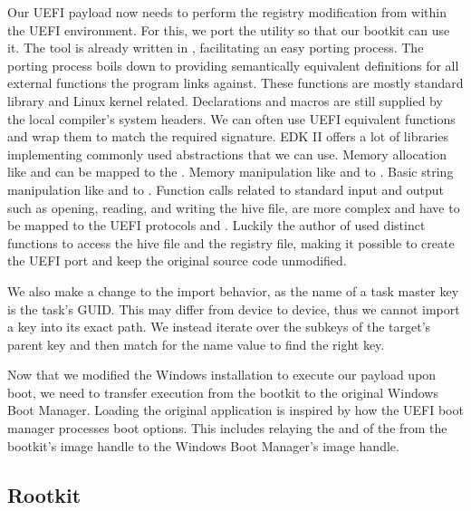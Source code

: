 Our \ac{UEFI} payload now needs to perform the registry modification from within the \ac{UEFI} environment.
For this, we port the  utility so that our bootkit can use it.
The tool is already written in , facilitating an easy porting process.
The porting process boils down to providing semantically equivalent definitions for all external functions the program links against.
These functions are mostly  standard library and Linux kernel related.
Declarations and macros are still supplied by the local compiler's system headers.
We can often use \ac{UEFI} equivalent functions and wrap them to match the required signature.
\ac{EDK} II offers a lot of libraries implementing commonly used abstractions that we can use.
Memory allocation like  and  can be mapped to the .
Memory manipulation like  and  to .
Basic string manipulation like  and  to .
Function calls related to standard input and output such as opening, reading, and writing the hive file, are more complex and have to be mapped to the \ac{UEFI} protocols  and .
Luckily the author of  used distinct functions to access the hive file and the registry file, making it possible to create the \ac{UEFI} port and keep the original source code unmodified.

We also make a change to the import behavior, as the name of a task master key is the task's \ac{GUID}.
This may differ from device to device, thus we cannot import a key into its exact path.
We instead iterate over the subkeys of the target's parent key and then match for the name value to find the right key.

Now that we modified the Windows installation to execute our payload upon boot, we need to transfer execution from the bootkit to the original Windows Boot Manager.
Loading the original application is inspired by how the \ac{UEFI} boot manager processes boot options.
This includes relaying the  and  of the  from the bootkit's image handle to the Windows Boot Manager's image handle.

\subsection{Rootkit}

